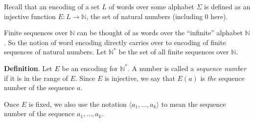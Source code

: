 \documentclass[12pt]{article}
\begin{document}
Recall that an encoding of a set $L$ of words over some alphabet $\Sigma$ is defined as an injective function $E: L\to \mathbb{N}$, the set of natural numbers (including $0$ here).

Finite sequences over $\mathbb{N}$ can be thought of as words over the ``infinite'' alphabet $\mathbb{N}$.  So the notion of word encoding directly carries over to encoding of finite sequences of natural numbers.  Let $\mathbb{N}^*$ be the set of all finite sequences over $\mathbb{N}$.

\textbf{Definition}.  Let $E$ be an encoding for $\mathbb{N}^*$.  A number is called a \emph{sequence number} if it is in the range of $E$.  Since $E$ is injective, we say that $E(a)$ is \emph{the} sequence number of the sequence $a$.  

Once $E$ is fixed, we also use the notation $\langle a_1, \ldots, a_k \rangle$ to mean the sequence number of the sequence $a_1,\ldots, a_k$.
\end{document}
